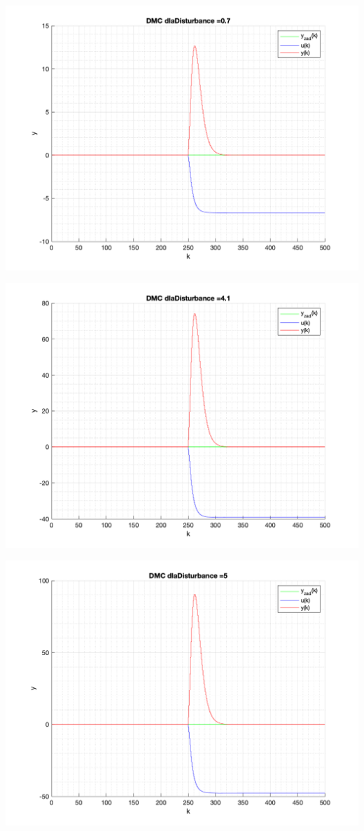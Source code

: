 \documentclass[a4paper, 11pt]{article}
\begin{document}
\begin{enumerate}
 \includegraphics[width=\linewidth]{./ModelsP4_Disturbance/P4_DMC_Disturbance_0_7_png.png} 
 
 \includegraphics[width=\linewidth]{./ModelsP4_Disturbance/P4_DMC_Disturbance_4_1_png.png} 
 
 \includegraphics[width=\linewidth]{./ModelsP4_Disturbance/P4_DMC_Disturbance_5_png.png} 
 

\end{enumerate}
\end{document}
